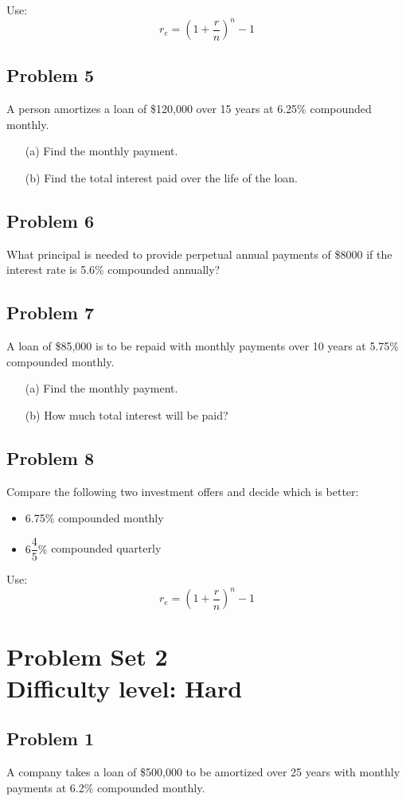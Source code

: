 \documentclass[12pt]{article}
\begin{document}
Use: \[
r_e = \left(1 + \dfrac{r}{n} \right)^n - 1
\]

\subsection*{Problem 5}
A person amortizes a loan of \$120,000 over 15 years at 6.25\% compounded monthly.
\begin{enumerate}
    \item[(a)] Find the monthly payment.
    \item[(b)] Find the total interest paid over the life of the loan.
\end{enumerate}

\subsection*{Problem 6}
What principal is needed to provide perpetual annual payments of \$8000 if the interest rate is 5.6\% compounded annually?

\subsection*{Problem 7}
A loan of \$85,000 is to be repaid with monthly payments over 10 years at 5.75\% compounded monthly.
\begin{enumerate}
    \item[(a)] Find the monthly payment.
    \item[(b)] How much total interest will be paid?
\end{enumerate}

\subsection*{Problem 8}
Compare the following two investment offers and decide which is better:
\begin{itemize}
    \item 6.75\% compounded monthly
    \item \(6\dfrac{4}{5}\%\) compounded quarterly
\end{itemize}
Use: 
\[
r_e = \left(1 + \dfrac{r}{n} \right)^n - 1
\]

\section*{Problem Set 2\\Difficulty level: Hard}
\subsection*{Problem 1}
A company takes a loan of \$500,000 to be amortized over 25 years with monthly payments at 6.2\% compounded monthly.
\end{document}
